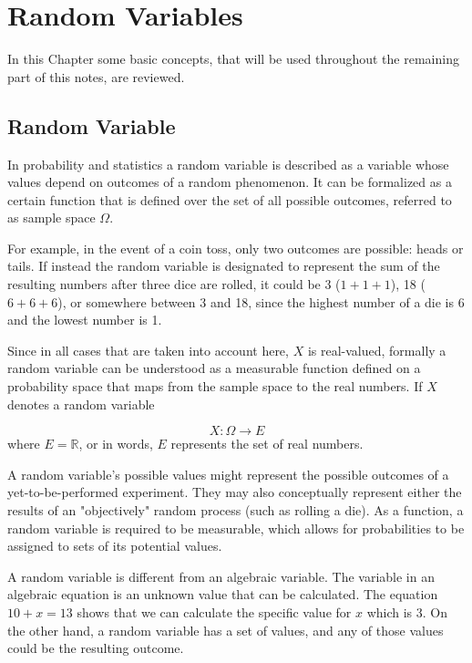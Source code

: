 \chapter{Random Variables}
\label{fundamentals}

In this Chapter some basic concepts, that will be used throughout the remaining part of this notes, are reviewed.

\section{Random Variable}
\label{random-variables}

In probability and statistics a random variable is described as a variable whose values depend on outcomes of a random phenomenon. 
It can be formalized as a certain function that is defined over the set of all possible outcomes, referred to as sample space \(\Omega\). 

For example, in the event of a coin toss, only two outcomes 
are possible: heads or tails. 
If instead the random variable is designated to represent the sum of the resulting numbers after 
three dice are rolled, it could be 3 ($1 + 1+ 1$), 18 ($6 + 6 + 6$), or somewhere between 3 and 18, 
since the highest number of a die is 6 and the lowest number is 1.

Since in all cases that are taken into account here, \(X\) is real-valued, formally a random variable can be understood as a measurable function defined on a probability space 
that maps from the sample space to the real numbers.
If \(X\) denotes a random variable

\begin{equation}
X:\Omega \rightarrow E
\end{equation}
where \(E=\mathbb {R}\), or in words, \(E\) represents the set of real numbers. 

A random variable's possible values might represent the possible outcomes of a yet-to-be-performed experiment. They may also conceptually represent either the results of an "objectively" random process (such as rolling a die). As a function, a random variable is required to be measurable, which allows for probabilities to be assigned to sets of its potential values. 

A random variable is different from an algebraic variable. The variable in an algebraic equation is an unknown value that can be calculated. The equation $10 + x = 13$ shows that we can calculate the specific value for $x$ which is 3. On the other hand, a random variable has a set of values, and any of those values could be the resulting outcome.


